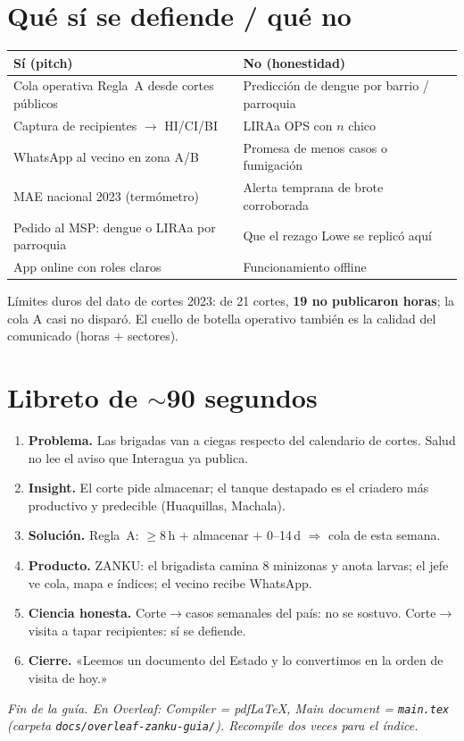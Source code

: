 \documentclass[11pt,a4paper]{article}
\begin{document}
\section{Qué sí se defiende / qué no}

\begin{longtable}{@{}p{6.2cm}p{6.2cm}@{}}
\toprule
\textbf{Sí (pitch)} & \textbf{No (honestidad)}\\
\midrule
\endhead
Cola operativa Regla~A desde cortes públicos & Predicción de dengue por
barrio / parroquia\\
Captura de recipientes $\rightarrow$ HI/CI/BI & LIRAa OPS con $n$ chico\\
WhatsApp al vecino en zona A/B & Promesa de menos casos o fumigación\\
MAE nacional 2023 (termómetro) & Alerta temprana de brote corroborada\\
Pedido al MSP: dengue o LIRAa por parroquia & Que el rezago Lowe se
replicó aquí\\
App online con roles claros & Funcionamiento offline\\
\bottomrule
\end{longtable}

Límites duros del dato de cortes 2023: de 21 cortes, \textbf{19 no
publicaron horas}; la cola A casi no disparó. El cuello de botella
operativo también es la calidad del comunicado (horas + sectores).

\section{Libreto de $\sim$90 segundos}

\begin{enumerate}[leftmargin=1.4em]
  \item \textbf{Problema.} Las brigadas van a ciegas respecto del
        calendario de cortes. Salud no lee el aviso que Interagua ya
        publica.
  \item \textbf{Insight.} El corte pide almacenar; el tanque destapado
        es el criadero más productivo y predecible (Huaquillas,
        Machala).
  \item \textbf{Solución.} Regla~A: $\geq 8$\,h + almacenar + 0--14\,d
        $\Rightarrow$ cola de esta semana.
  \item \textbf{Producto.} ZANKU: el brigadista camina 8 minizonas y
        anota larvas; el jefe ve cola, mapa e índices; el vecino recibe
        WhatsApp.
  \item \textbf{Ciencia honesta.} Corte$\to$casos semanales del país: no
        se sostuvo. Corte$\to$visita a tapar recipientes: sí se defiende.
  \item \textbf{Cierre.} «Leemos un documento del Estado y lo convertimos
        en la orden de visita de hoy.»
\end{enumerate}

\vspace{1em}
\noindent\textit{Fin de la guía. En Overleaf: Compiler = pdfLaTeX,
Main document = \texttt{main.tex} (carpeta \texttt{docs/overleaf-zanku-guia/}).
Recompile dos veces para el índice.}
\end{document}
